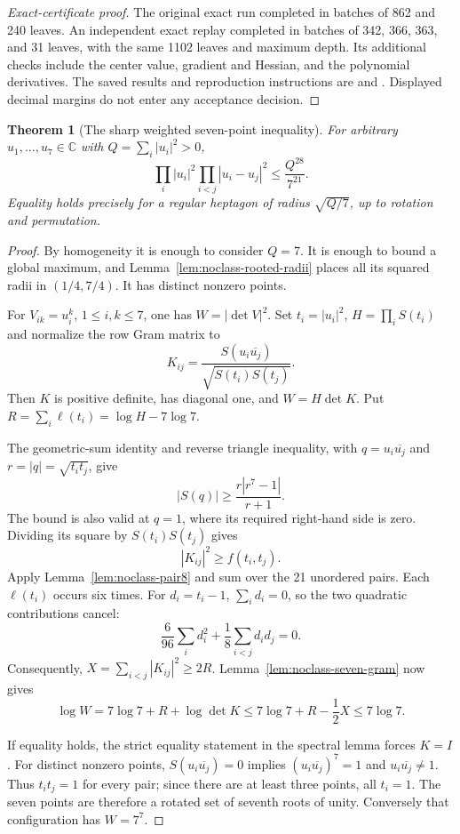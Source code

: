 \documentclass[11pt]{article}
\newtheorem{theorem}{Theorem}[section]
\theoremstyle{remark}
\numberwithin{equation}{section}
\begin{document}
\begin{proof}[Exact-certificate proof]
The original exact run completed in batches of 862 and 240
leaves. An independent exact replay completed in batches of
342, 366, 363, and 31 leaves, with the same 1102 leaves and
maximum depth. Its additional checks include the center
value, gradient and Hessian, and the polynomial derivatives.
The saved results and reproduction instructions are
 and
. Displayed decimal
margins do not enter any acceptance decision.
\end{proof}

\begin{theorem}[The sharp weighted seven-point inequality]
\label{thm:noclass-weighted7}
For arbitrary $u_1,\ldots,u_7\in\mathbb C$ with
$Q=\sum_i|u_i|^2>0$,
\[
 \boxed{\displaystyle
 \prod_i|u_i|^2\prod_{i<j}|u_i-u_j|^2
 \le\frac{Q^{28}}{7^{21}}.}
\]
Equality holds precisely for a regular heptagon of radius
$\sqrt{Q/7}$, up to rotation and permutation.
\end{theorem}
\begin{proof}
By homogeneity it is enough to consider $Q=7$.
It is enough to bound a global maximum, and
Lemma~\ref{lem:noclass-rooted-radii} places all its squared
radii in $(1/4,7/4)$. It has distinct nonzero points.

For $V_{ik}=u_i^k$, $1\le i,k\le7$, one has
$W=|\det V|^2$. Set $t_i=|u_i|^2$, $H=\prod_iS(t_i)$
and normalize the row Gram matrix to
\[
 K_{ij}=
 \frac{S(u_i\overline{u_j})}{\sqrt{S(t_i)S(t_j)}}.
\]
Then $K$ is positive definite, has diagonal one, and
$W=H\det K$. Put $R=\sum_i\ell(t_i)=\log H-7\log7$.

The geometric-sum identity and reverse triangle inequality,
with $q=u_i\overline{u_j}$ and $r=|q|=\sqrt{t_it_j}$, give
\[
 |S(q)|\ge\frac{r|r^7-1|}{r+1}.
\]
The bound is also valid at $q=1$, where its required
right-hand side is zero. Dividing its square by
$S(t_i)S(t_j)$ gives
\[
 |K_{ij}|^2\ge f(t_i,t_j).
\]
Apply Lemma~\ref{lem:noclass-pair8} and sum over the 21
unordered pairs. Each $\ell(t_i)$ occurs six times.
For $d_i=t_i-1$, $\sum_i d_i=0$, so the two quadratic
contributions cancel:
\[
 \frac6{96}\sum_i d_i^2+
 \frac18\sum_{i<j}d_id_j=0.
\]
Consequently, $X=\sum_{i<j}|K_{ij}|^2\ge2R$.
Lemma~\ref{lem:noclass-seven-gram} now gives
\[
 \log W=7\log7+R+\log\det K
 \le7\log7+R-\frac12X\le7\log7.
\]

If equality holds, the strict equality statement in the
spectral lemma forces $K=I$. For distinct nonzero points,
$S(u_i\overline{u_j})=0$ implies
$(u_i\overline{u_j})^7=1$ and
$u_i\overline{u_j}\ne1$. Thus $t_it_j=1$ for every pair;
since there are at least three points, all $t_i=1$.
The seven points are therefore a rotated set of seventh
roots of unity. Conversely that configuration has $W=7^7$.
\end{proof}
\end{document}
